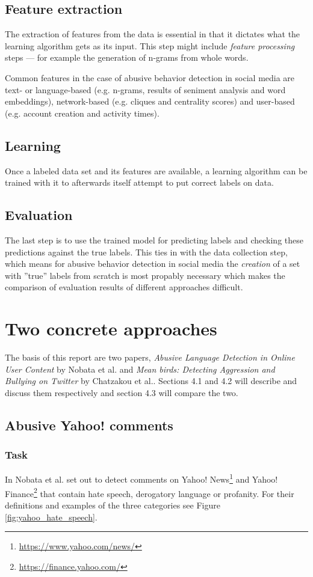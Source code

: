 \documentclass{proseminar}
\begin{document}
\subsection{Feature extraction}
The extraction of features from the data is essential in that it dictates what the learning algorithm gets as its input. This step might include \emph{feature processing} steps --- for example the generation of n-grams from whole words.

Common features in the case of abusive behavior detection in social media are text- or language-based (e.g. n-grams, results of seniment analysis and word embeddings), network-based (e.g. cliques and centrality scores) and user-based (e.g. account creation and activity times).

\subsection{Learning}
Once a labeled data set and its features are available, a learning algorithm can be trained with it to afterwards itself attempt to put correct labels on data.

\subsection{Evaluation}
The last step is to use the trained model for predicting labels and checking these predictions against the true labels. This ties in with the data collection step, which means for abusive behavior detection in social media the \emph{creation} of a set with ''true'' labels from scratch is most propably necessary which makes the comparison of evaluation results of different approaches difficult.

\section{Two concrete approaches}
The basis of this report are two papers, \emph{Abusive Language Detection in Online User Content} by Nobata et al.\cite{Yahoo:2016} and \emph{Mean birds: Detecting Aggression and Bullying on Twitter} by Chatzakou et al.\cite{Twitter:2017}. Sections 4.1 and 4.2 will describe and discuss them respectively and section 4.3 will compare the two.

\subsection{Abusive Yahoo! comments}
\subsubsection{Task}
In \cite{Yahoo:2016} Nobata et al. set out to detect comments on Yahoo! News\footnote{\url{https://www.yahoo.com/news/}} and Yahoo! Finance\footnote{\url{https://finance.yahoo.com/}} that contain hate speech, derogatory language or profanity. For their definitions and examples of the three categories see Figure \ref{fig:yahoo_hate_speech}.
\end{document}
